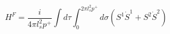 \begin{equation}
H^F = \frac{i}{4 \pi l_s^2 p^+} \int d \tau \int_{0}^{2 \pi l_s^2 p^+} d \sigma
\left( S^1 \dot{S}^1 +  S^2 \dot{S}^2 \right)
\end{equation}

